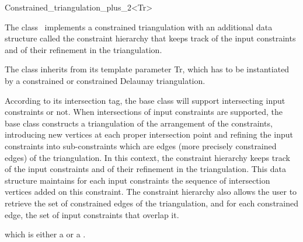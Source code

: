 

\begin{ccRefClass}{Constrained_triangulation_plus_2<Tr>}  %


The class \ccRefName\ 
implements a constrained triangulation 
with an additional data
structure called the  constraint hierarchy 
that keeps track of  the input constraints and of their refinement
in the triangulation.

The class 
inherits from its template parameter Tr, which has to be instantiated
by a constrained or constrained Delaunay  triangulation.

According to its intersection tag, the base class
will support intersecting input constraints or not.
When intersections of input constraints are supported,
the base class constructs a triangulation  of the  arrangement
of the constraints,
introducing new vertices at each proper intersection
point and  refining the input constraints into sub-constraints
which are edges (more precisely constrained edges) of the
triangulation. 
In this context, the constraint hierarchy 
keeps track of  the input constraints and of their refinement
in the triangulation. This data structure 
maintains for each input constraints 
the sequence of intersection vertices added on this constraint.
The constraint hierarchy also allows the user to retrieve the set
of constrained edges of the triangulation, and for each
constrained edge,  the set of input constraints that overlap it.


\ccInheritsFrom
{} which is either a  or a .

\ccTypes 
{}
\ccGlue
{}


\end{ccRefClass}
